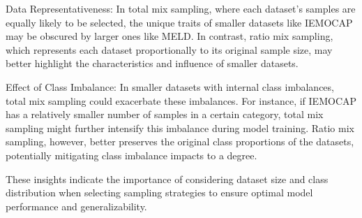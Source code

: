\documentclass[conference]{IEEEtran}
\begin{document}
Data Representativeness: In total mix sampling, where each dataset's samples are equally likely to be selected, the unique traits of smaller datasets like IEMOCAP may be obscured by larger ones like MELD. In contrast, ratio mix sampling, which represents each dataset proportionally to its original sample size, may better highlight the characteristics and influence of smaller datasets.

Effect of Class Imbalance: In smaller datasets with internal class imbalances, total mix sampling could exacerbate these imbalances. For instance, if IEMOCAP has a relatively smaller number of samples in a certain category, total mix sampling might further intensify this imbalance during model training. Ratio mix sampling, however, better preserves the original class proportions of the datasets, potentially mitigating class imbalance impacts to a degree.

These insights indicate the importance of considering dataset size and class distribution when selecting sampling strategies to ensure optimal model performance and generalizability.
\end{document}
